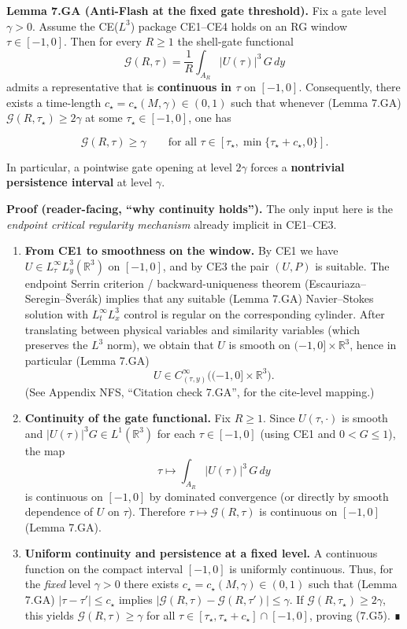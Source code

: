 \documentclass[
  11pt,
]{article}
\begin{document}
\textbf{Lemma 7.GA (Anti-Flash at the fixed gate threshold).} Fix a gate level \(\gamma>0\). Assume the CE(\(L^3\)) package CE1--CE4 holds on an RG window \(\tau\in[-1,0]\). Then for every \(R\ge 1\) the shell-gate functional \[
\mathcal G(R,\tau)=\frac1R\int_{A_R}|U(\tau)|^3\,G\,dy
\] admits a representative that is \textbf{continuous in \(\tau\)} on \([-1,0]\). Consequently, there exists a time-length \(c_\star=c_\star(M,\gamma)\in(0,1)\) such that whenever (Lemma 7.GA) \(\mathcal G(R,\tau_\star)\ge 2\gamma\) at some \(\tau_\star\in[-1,0]\), one has

\begin{equation}
\mathcal G(R,\tau)\ge \gamma
\qquad\text{for all }\tau\in[\tau_\star,\min\{\tau_\star+c_\star,0\}].
\tag{7.G5}
\end{equation}

In particular, a pointwise gate opening at level \(2\gamma\) forces a \textbf{nontrivial persistence interval} at level \(\gamma\).

\textbf{Proof (reader-facing, ``why continuity holds'').} The only input here is the \emph{endpoint critical regularity mechanism} already implicit in CE1--CE3.

\begin{enumerate}
\def\labelenumi{\arabic{enumi})}
\item
  \textbf{From CE1 to smoothness on the window.} By CE1 we have \(U\in L^\infty_\tau L^3_y(\mathbb R^3)\) on \([-1,0]\), and by CE3 the pair \((U,P)\) is suitable. The endpoint Serrin criterion / backward-uniqueness theorem (Escauriaza--Seregin--Šverák) implies that any suitable (Lemma 7.GA) Navier--Stokes solution with \(L^\infty_tL^3_x\) control is regular on the corresponding cylinder. After translating between physical variables and similarity variables (which preserves the \(L^3\) norm), we obtain that \(U\) is smooth on \((-1,0]\times\mathbb R^3\), hence in particular (Lemma 7.GA) \[
  U\in C^\infty_{(\tau,y)}\big((-1,0]\times\mathbb R^3\big).
  \] (See Appendix NFS, ``Citation check 7.GA'', for the cite-level mapping.)
\item
  \textbf{Continuity of the gate functional.} Fix \(R\ge 1\). Since \(U(\tau,\cdot)\) is smooth and \(|U(\tau)|^3G\in L^1(\mathbb R^3)\) for each \(\tau\in[-1,0]\) (using CE1 and \(0<G\le 1\)), the map \[
  \tau\longmapsto \int_{A_R}|U(\tau)|^3\,G\,dy
  \] is continuous on \([-1,0]\) by dominated convergence (or directly by smooth dependence of \(U\) on \(\tau\)). Therefore \(\tau\mapsto \mathcal G(R,\tau)\) is continuous on \([-1,0]\) (Lemma 7.GA).
\item
  \textbf{Uniform continuity and persistence at a fixed level.} A continuous function on the compact interval \([-1,0]\) is uniformly continuous. Thus, for the \emph{fixed} level \(\gamma>0\) there exists \(c_\star=c_\star(M,\gamma)\in(0,1)\) such that (Lemma 7.GA) \(|\tau-\tau'|\le c_\star\) implies \(|\mathcal G(R,\tau)-\mathcal G(R,\tau')|\le \gamma\). If \(\mathcal G(R,\tau_\star)\ge 2\gamma\), this yields \(\mathcal G(R,\tau)\ge\gamma\) for all \(\tau\in[\tau_\star,\tau_\star+c_\star]\cap[-1,0]\), proving (7.G5). ∎
\end{enumerate}
\end{document}
